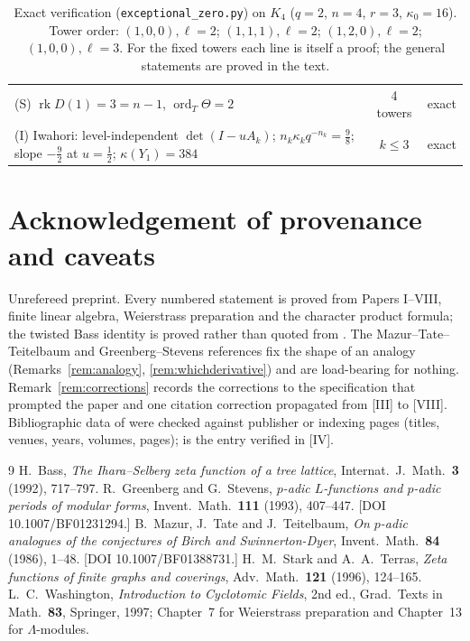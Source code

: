 \documentclass[11pt]{amsart}
\numberwithin{equation}{section}
\theoremstyle{definition}
\theoremstyle{remark}
\newcommand{\La}{\Lambda}
\newcommand{\ord}{\operatorname{ord}}
\newcommand{\rk}{\operatorname{rk}}
\begin{document}
\begin{table}[ht]
\begin{tabular}{p{11.3cm}cl}
(S) $\rk D(1)=3=n-1$, $\ord_T\Theta=2$ & 4 towers & exact\\
(I) Iwahori: level-independent $\det(I-uA_k)$; $n_k\kappa_kq^{-n_k}=\frac98$; slope $-\frac92$ at $u=\frac12$; $\kappa(Y_1)=384$ & $k\le3$ & exact\\
\bottomrule
\end{tabular}
\medskip
\caption{Exact verification (\texttt{exceptional\_zero.py}) on $K_4$ ($q=2$, $n=4$,
$r=3$, $\kappa_0=16$). Tower order: $(1,0,0),\ell=2$; $(1,1,1),\ell=2$;
$(1,2,0),\ell=2$; $(1,0,0),\ell=3$. For the fixed towers each line is itself a proof;
the general statements are proved in the text.}
\label{tab:battery}
\end{table}

\section*{Acknowledgement of provenance and caveats}

Unrefereed preprint. Every numbered statement is proved from Papers I--VIII, finite
linear algebra, Weierstrass preparation \cite{Wa} and the character product formula;
the twisted Bass identity is proved rather than quoted from \cite{ST}. The
Mazur--Tate--Teitelbaum and Greenberg--Stevens references \cite{MTT,GS} fix the shape of
an analogy (Remarks~\ref{rem:analogy}, \ref{rem:whichderivative}) and are load-bearing
for nothing. Remark~\ref{rem:corrections} records the corrections to the specification
that prompted the paper and one citation correction propagated from [III] to [VIII].
Bibliographic data of \cite{MTT,GS,ST,Ba} were checked against publisher or indexing
pages (titles, venues, years, volumes, pages); \cite{Wa} is the entry verified in [IV].

\begin{thebibliography}{9}
 H.~Bass, \emph{The Ihara--Selberg zeta function of a tree lattice},
Internat.\ J.\ Math.\ \textbf{3} (1992), 717--797.
 R.~Greenberg and G.~Stevens, \emph{$p$-adic $L$-functions and $p$-adic
periods of modular forms}, Invent.\ Math.\ \textbf{111} (1993), 407--447.
[DOI 10.1007/BF01231294.]
 B.~Mazur, J.~Tate and J.~Teitelbaum, \emph{On $p$-adic analogues of the
conjectures of Birch and Swinnerton-Dyer}, Invent.\ Math.\ \textbf{84} (1986), 1--48.
[DOI 10.1007/BF01388731.]
 H.~M.~Stark and A.~A.~Terras, \emph{Zeta functions of finite graphs and
coverings}, Adv.\ Math.\ \textbf{121} (1996), 124--165.
 L.~C.~Washington, \emph{Introduction to Cyclotomic Fields}, 2nd ed.,
Grad.\ Texts in Math.\ \textbf{83}, Springer, 1997; Chapter~7 for Weierstrass
preparation and Chapter~13 for $\La$-modules.
\end{thebibliography}
\end{document}
